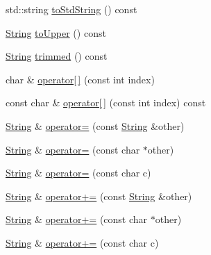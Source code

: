 \begin{DoxyCompactItemize}
std\+::string \hyperlink{classprism_1_1_string_ad1018741610a6723a38ab52255147ac4}{to\+Std\+String} () const 
\item 
\hyperlink{classprism_1_1_string}{String} \hyperlink{classprism_1_1_string_afd1fc3691cbc2f267fc3d1d8f27d2c3a}{to\+Upper} () const 
\item 
\hyperlink{classprism_1_1_string}{String} \hyperlink{classprism_1_1_string_aef7dc34213c574a72c893f943a41e8e4}{trimmed} () const 
\item 
char \& \hyperlink{classprism_1_1_string_a2aa545085262fc28c9199a5790bfbd0a}{operator\mbox{[}$\,$\mbox{]}} (const int index)
\item 
const char \& \hyperlink{classprism_1_1_string_ad519fe1a0696fe5c4b77808d605bc68e}{operator\mbox{[}$\,$\mbox{]}} (const int index) const 
\item 
\hyperlink{classprism_1_1_string}{String} \& \hyperlink{classprism_1_1_string_ad2c84ac36bccdb26c446d32a1615f321}{operator=} (const \hyperlink{classprism_1_1_string}{String} \&other)
\item 
\hyperlink{classprism_1_1_string}{String} \& \hyperlink{classprism_1_1_string_a72162e465f226763b741467865d506e2}{operator=} (const char $\ast$other)
\item 
\hyperlink{classprism_1_1_string}{String} \& \hyperlink{classprism_1_1_string_a61f21a091fec77de84ceab239b6d9c7d}{operator=} (const char c)
\item 
\hyperlink{classprism_1_1_string}{String} \& \hyperlink{classprism_1_1_string_a8d509ab7982bc6176c58f5fbce1da15c}{operator+=} (const \hyperlink{classprism_1_1_string}{String} \&other)
\item 
\hyperlink{classprism_1_1_string}{String} \& \hyperlink{classprism_1_1_string_a1a282edfd99b7570eb83a8c1188c5e2b}{operator+=} (const char $\ast$other)
\item 
\hyperlink{classprism_1_1_string}{String} \& \hyperlink{classprism_1_1_string_a28499824b5ab71a12c7f296e1428cf79}{operator+=} (const char c)
\end{DoxyCompactItemize}
